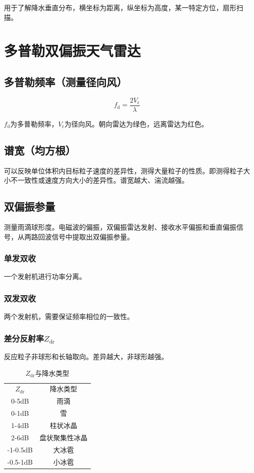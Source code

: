 \documentclass[UTF8,11pt]{ctexbook}
\begin{document}
用于了解降水垂直分布，横坐标为距离，纵坐标为高度，某一特定方位，扇形扫描。

\section{多普勒双偏振天气雷达}

\subsection{多普勒频率（测量径向风）}
\[
f_\mathrm{d}=\frac{2V_\mathrm{r}}{\lambda}
\]

\(f_\mathrm{d}\)为多普勒频率，\(V_\mathrm{r}\)为径向风。朝向雷达为绿色，远离雷达为红色。

\subsection{谱宽（均方根）}

可以反映单位体积内目标粒子速度的差异性，测得大量粒子的性质。即测得粒子大小不一致性或速度方向大小的差异性。谱宽越大、湍流越强。

\subsection{双偏振参量}

测量雨滴球形度。电磁波的偏振，双偏振雷达发射、接收水平偏振和垂直偏振信号，从两路回波信号中提取出双偏振参量。

\subsubsection{单发双收}

一个发射机进行功率分离。

\subsubsection{双发双收}

两个发射机，需要保证频率相位的一致性。

\subsubsection{差分反射率\(Z_\mathrm{dr}\)}

反应粒子非球形和长轴取向。差异越大，非球形越强。
\begin{table}[htbp]
    \centering
    \caption{\(Z_\mathrm{dr}\)与降水类型}
    \begin{tabular}{cc}
        \toprule
        \(Z_\mathrm{dr}\) & 降水类型\\
        0-5dB & 雨滴\\
        0-1dB & 雪\\
        1-4dB & 柱状冰晶\\
        2-6dB & 盘状聚集性冰晶\\
        -1-0.5dB & 大冰雹\\
        -0.5-1dB & 小冰雹\\
        \bottomrule
    \end{tabular}
\end{table}
\end{document}
